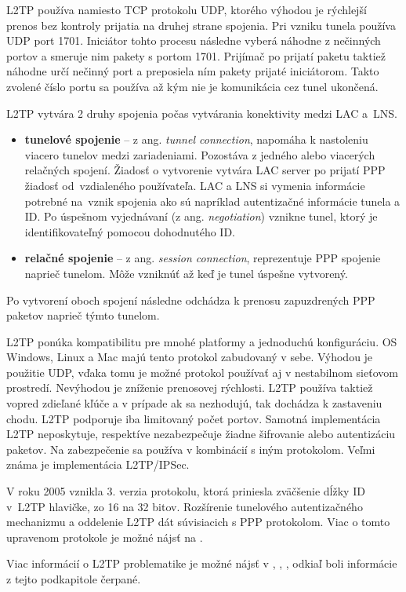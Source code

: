L2TP používa namiesto TCP protokolu UDP, ktorého výhodou je rýchlejší prenos bez kontroly prijatia na druhej strane spojenia.  
Pri vzniku tunela používa UDP port 1701. Iniciátor tohto procesu následne vyberá náhodne z nečinných portov a smeruje nim pakety s portom 1701. Prijímač po prijatí paketu taktiež náhodne určí nečinný port a preposiela ním pakety prijaté iniciátorom. Takto zvolené číslo portu sa používa až kým nie je komunikácia cez tunel ukončená. 

L2TP vytvára 2 druhy spojenia počas vytvárania konektivity medzi LAC a~LNS. 
\begin{itemize}
	\item{\textbf{tunelové spojenie}} -- z ang. \textit{tunnel connection}, napomáha k nastoleniu viacero tunelov medzi zariadeniami. Pozostáva z jedného alebo viacerých relačných spojení. Žiadosť o vytvorenie vytvára LAC server po prijatí PPP žiadosť od~vzdialeného používateľa. LAC a LNS si vymenia informácie potrebné na~vznik spojenia ako sú napríklad autentizačné informácie tunela a ID. Po úspešnom vyjednávaní (z ang. \textit{negotiation}) vznikne tunel, ktorý je identifikovateľný pomocou dohodnutého ID.  
	\item{\textbf{relačné spojenie}} -- z ang. \textit{session connection}, reprezentuje PPP spojenie naprieč tunelom. Môže vzniknúť až keď je tunel úspešne vytvorený.	
\end{itemize}     
Po vytvorení oboch spojení následne odchádza k prenosu zapuzdrených PPP paketov naprieč týmto tunelom.

L2TP ponúka kompatibilitu pre mnohé platformy a jednoduchú konfiguráciu. OS Windows, Linux a Mac majú tento protokol zabudovaný v sebe. Výhodou je použitie UDP, vďaka tomu je možné protokol používať aj v nestabilnom sieťovom prostredí.
Nevýhodou je zníženie prenosovej rýchlosti. L2TP používa taktiež vopred zdieľané kľúče a v prípade ak sa nezhodujú, tak dochádza k zastaveniu chodu. L2TP podporuje iba limitovaný počet portov. Samotná implementácia L2TP neposkytuje, respektíve nezabezpečuje žiadne šifrovanie alebo autentizáciu paketov. Na zabezpečenie sa používa v kombinácií s iným protokolom. Veľmi známa je implementácia L2TP/IPSec. 

V roku 2005 vznikla 3. verzia protokolu, ktorá priniesla zväčšenie dĺžky ID v~L2TP hlavičke, zo 16 na 32 bitov. Rozšírenie tunelového autentizačného mechanizmu a oddelenie L2TP dát súvisiacich s PPP protokolom. Viac o tomto upravenom protokole je možné nájsť na \cite{l2tpv3}.
  
Viac informácií o L2TP problematike je možné nájsť v \cite{l2tp}, \cite{rfc2661}, \cite{l2tphuawei}, odkiaľ boli informácie z tejto podkapitole čerpané. 

